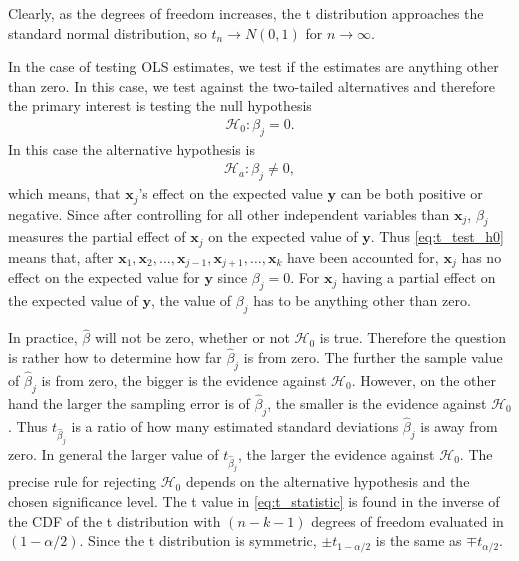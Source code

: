 Clearly, as the degrees of freedom increases, the t distribution approaches the standard normal distribution, so $t_n \rightarrow N(0,1)$ for $n\rightarrow \infty$. 

In the case of testing OLS estimates, we test if the estimates are anything other than zero. In this case, we test against the two-tailed alternatives and therefore the primary interest is testing the null hypothesis
\begin{align} \label{eq:t_test_h0}
    \mathcal{H}_0:\beta_j=0.
\end{align}
In this case the alternative hypothesis is
\begin{align} \label{eq:t_test_ha}
    \mathcal{H}_a : \beta_j \neq 0,
\end{align}
which means, that $\textbf{x}_j$'s effect on the expected value $\textbf{y}$ can be both positive or negative.
Since after controlling for all other independent variables than $\textbf{x}_j$, $\beta_j$ measures the partial effect of $\textbf{x}_j$ on the expected value of $\textbf{y}$. 
Thus \eqref{eq:t_test_h0} means that, after $\textbf{x}_1,\textbf{x}_2, \ldots, \textbf{x}_{j-1}, \textbf{x}_{j+1}, \ldots, \textbf{x}_k$ have been accounted for, $\textbf{x}_j$ has no effect on the expected value for $\textbf{y}$ since $\beta_j=0$. 
For $\textbf{x}_j$ having a partial effect on the expected value of $\textbf{y}$, the value of $\beta_j$ has to be anything other than zero.

In practice, $\hat{\beta}$ will not be zero, whether or not $\mathcal{H}_0$ is true. Therefore the question is rather how to determine how far $\hat{\beta}_j$ is from zero. The further the sample value of $\hat{\beta}_j$ is from zero, the bigger is the evidence against $\mathcal{H}_0$. 
However, on the other hand the larger the sampling error is of $\hat{\beta}_j$, the smaller is the evidence against $\mathcal{H}_0$. Thus $t_{\hat{\beta}_j}$ is a ratio of how many estimated standard deviations $\hat{\beta}_j$ is away from zero.
In general the larger value of $t_{\hat{\beta}_j}$, the larger the evidence against $\mathcal{H}_0$. 
The precise rule for rejecting $\mathcal{H}_0$ depends on the alternative hypothesis and the chosen significance level.
The t value in \eqref{eq:t_statistic} is found in the inverse of the CDF of the t distribution with $(n - k - 1)$ degrees of freedom evaluated in $(1-\alpha/2)$. 
Since the t distribution is symmetric, $\pm t_{1-\alpha/2}$ is the same as $\mp t_{\alpha/2}$.

